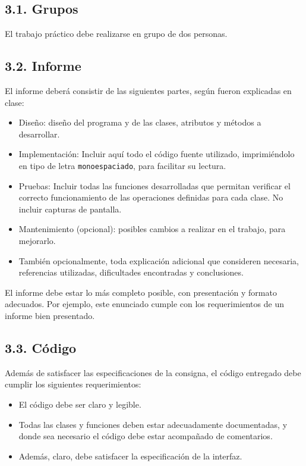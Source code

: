 \documentclass[12pt,spanish,]{article}
\begin{document}
\subsection{3.1. Grupos}\label{grupos}

El trabajo práctico debe realizarse en grupo de dos personas.

\subsection{3.2. Informe}\label{informe}

El informe deberá consistir de las siguientes partes, según fueron
explicadas en clase:

\begin{itemize}
\item
  Diseño: diseño del programa y de las clases, atributos y métodos a
  desarrollar.
\item
  Implementación: Incluir aquí todo el código fuente utilizado,
  imprimiéndolo en tipo de letra \texttt{monoespaciado}, para facilitar
  su lectura.
\item
  Pruebas: Incluir todas las funciones desarrolladas que permitan
  verificar el correcto funcionamiento de las operaciones definidas para
  cada clase. No incluir capturas de pantalla.
\item
  Mantenimiento (opcional): posibles cambios a realizar en el trabajo,
  para mejorarlo.
\item
  También opcionalmente, toda explicación adicional que consideren
  necesaria, referencias utilizadas, dificultades encontradas y
  conclusiones.
\end{itemize}

El informe debe estar lo más completo posible, con presentación y
formato adecuados. Por ejemplo, este enunciado cumple con los
requerimientos de un informe bien presentado.

\subsection{3.3. Código}\label{cuxf3digo}

Además de satisfacer las especificaciones de la consigna, el código
entregado debe cumplir los siguientes requerimientos:

\begin{itemize}
\item
  El código debe ser claro y legible.
\item
  Todas las clases y funciones deben estar adecuadamente documentadas, y
  donde sea necesario el código debe estar acompañado de comentarios.
\item
  Además, claro, debe satisfacer la especificación de la interfaz.
\end{itemize}
\end{document}
